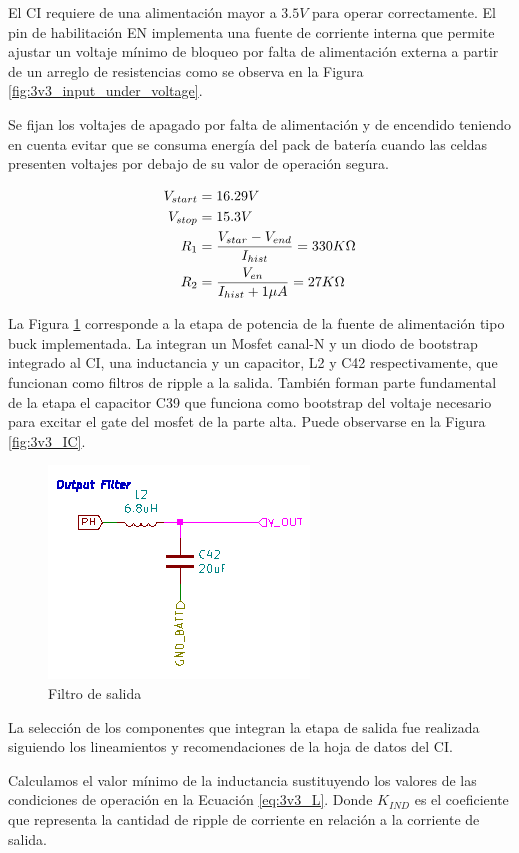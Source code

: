 \documentclass[10pt, a4paper]{report}
\begin{document}
El \acrshort{CI} requiere de una alimentación mayor a $3.5 V$ para operar
correctamente. El pin de habilitación EN implementa una fuente de corriente
interna que permite ajustar un voltaje mínimo de bloqueo por falta de
alimentación externa a partir de un arreglo de resistencias como se observa en
la Figura \ref{fig:3v3_input_under_voltage}.

Se fijan los voltajes de apagado por falta de alimentación y de encendido
teniendo en cuenta evitar que se consuma energía del pack de batería cuando las
celdas presenten voltajes por debajo de su valor de operación segura.

\begin{align}
    V_{start} &= 16.29V \\
    V_{stop} &= 15.3V \\
    R_{1} &= \frac{V_{star} - V_{end}}{I_{hist}} = 330K\ohm \\
    R_{2} &= \frac{V_{en}}{I_{hist} + 1\mu A} = 27K\ohm 
\end{align}

La Figura \ref{fig:3v3_output_filter} corresponde a la etapa de potencia de la
fuente de alimentación tipo buck implementada. La integran un Mosfet canal-N y
un diodo de bootstrap integrado al \acrshort{CI}, una inductancia y un 
capacitor, L2 y C42 respectivamente, que funcionan como filtros de ripple a la
salida. También forman parte fundamental de la etapa el capacitor C39 que
funciona como bootstrap del voltaje necesario para excitar el gate del mosfet de
la parte alta. Puede observarse en la Figura \ref{fig:3v3_IC}.

\begin{figure}[h!]
    \centering
    \includegraphics[width=0.3\linewidth]{hardware/3v3/3v3_output_filter.png}
    \caption{Filtro de salida}
    \label{fig:3v3_output_filter}
\end{figure}

La selección de los componentes que integran la etapa de salida fue realizada
siguiendo los lineamientos y recomendaciones de la hoja de datos del
\acrshort{CI}. 

Calculamos el valor mínimo de la inductancia sustituyendo los valores de las
condiciones de operación en la Ecuación \ref{eq:3v3_L}. Donde $K_{IND}$ es el
coeficiente que representa la cantidad de ripple de corriente en relación a la
corriente de salida.
\end{document}
